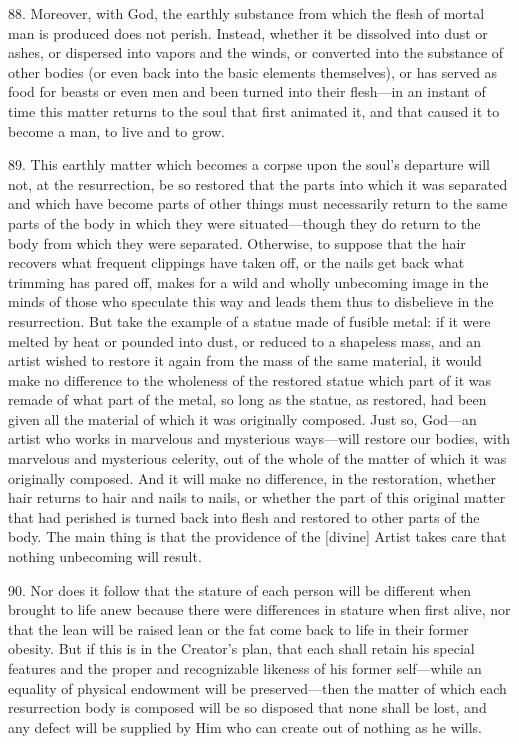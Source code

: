 88. Moreover, with God, the earthly substance from which the flesh of mortal man is produced does not perish. Instead, whether it be dissolved into dust or ashes, or dispersed into vapors and the winds, or converted into the substance of other bodies (or even back into the basic elements themselves), or has served as food for beasts or even men and been turned into their flesh—in an instant of time this matter returns to the soul that first animated it, and that caused it to become a man, to live and to grow.

89. This earthly matter which becomes a corpse upon the soul's departure will not, at the resurrection, be so restored that the parts into which it was separated and which have become parts of other things must necessarily return to the same parts of the body in which they were situated—though they do return to the body from which they were separated. Otherwise, to suppose that the hair recovers what frequent clippings have taken off, or the nails get back what trimming has pared off, makes for a wild and wholly unbecoming image in the minds of those who speculate this way and leads them thus to disbelieve in the resurrection. But take the example of a statue made of fusible metal: if it were melted by heat or pounded into dust, or reduced to a shapeless mass, and an artist wished to restore it again from the mass of the same material, it would make no difference to the wholeness of the restored statue which part of it was remade of what part of the metal, so long as the statue, as restored, had been given all the material of which it was originally composed. Just so, God—an artist who works in marvelous and mysterious ways—will restore our bodies, with marvelous and mysterious celerity, out of the whole of the matter of which it was originally composed. And it will make no difference, in the restoration, whether hair returns to hair and nails to nails, or whether the part of this original matter that had perished is turned back into flesh and restored to other parts of the body. The main thing is that the providence of the [divine] Artist takes care that nothing unbecoming will result.

90. Nor does it follow that the stature of each person will be different when brought to life anew because there were differences in stature when first alive, nor that the lean will be raised lean or the fat come back to life in their former obesity. But if this is in the Creator's plan, that each shall retain his special features and the proper and recognizable likeness of his former self—while an equality of physical endowment will be preserved—then the matter of which each resurrection body is composed will be so disposed that none shall be lost, and any defect will be supplied by Him who can create out of nothing as he wills.

